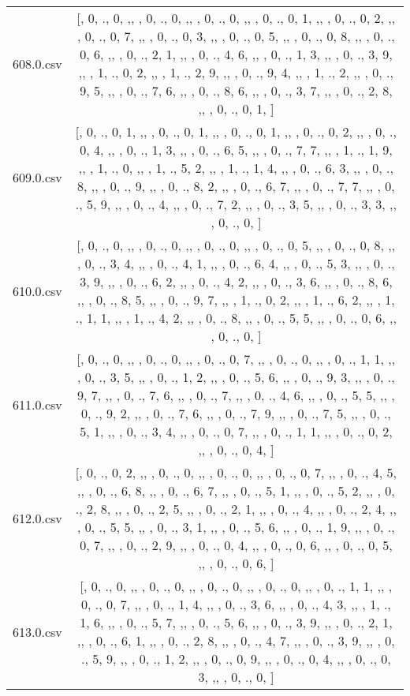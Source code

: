 \begin{table}[ht]
\begin{tabular}{@{}c c@{}}
	608.0.csv & [, 0, ., 0, ,,  , 0, ., 0, ,,  , 0, ., 0, ,,  , 0, ., 0, 1, ,,  , 0, ., 0, 2, ,,  , 0, ., 0, 7, ,,  , 0, ., 0, 3, ,,  , 0, ., 0, 5, ,,  , 0, ., 0, 8, ,,  , 0, ., 0, 6, ,,  , 0, ., 2, 1, ,,  , 0, ., 4, 6, ,,  , 0, ., 1, 3, ,,  , 0, ., 3, 9, ,,  , 1, ., 0, 2, ,,  , 1, ., 2, 9, ,,  , 0, ., 9, 4, ,,  , 1, ., 2, ,,  , 0, ., 9, 5, ,,  , 0, ., 7, 6, ,,  , 0, ., 8, 6, ,,  , 0, ., 3, 7, ,,  , 0, ., 2, 8, ,,  , 0, ., 0, 1, ]\\ 
	609.0.csv & [, 0, ., 0, 1, ,,  , 0, ., 0, 1, ,,  , 0, ., 0, 1, ,,  , 0, ., 0, 2, ,,  , 0, ., 0, 4, ,,  , 0, ., 1, 3, ,,  , 0, ., 6, 5, ,,  , 0, ., 7, 7, ,,  , 1, ., 1, 9, ,,  , 1, ., 0, ,,  , 1, ., 5, 2, ,,  , 1, ., 1, 4, ,,  , 0, ., 6, 3, ,,  , 0, ., 8, ,,  , 0, ., 9, ,,  , 0, ., 8, 2, ,,  , 0, ., 6, 7, ,,  , 0, ., 7, 7, ,,  , 0, ., 5, 9, ,,  , 0, ., 4, ,,  , 0, ., 7, 2, ,,  , 0, ., 3, 5, ,,  , 0, ., 3, 3, ,,  , 0, ., 0, ]\\ 
	610.0.csv & [, 0, ., 0, ,,  , 0, ., 0, ,,  , 0, ., 0, ,,  , 0, ., 0, 5, ,,  , 0, ., 0, 8, ,,  , 0, ., 3, 4, ,,  , 0, ., 4, 1, ,,  , 0, ., 6, 4, ,,  , 0, ., 5, 3, ,,  , 0, ., 3, 9, ,,  , 0, ., 6, 2, ,,  , 0, ., 4, 2, ,,  , 0, ., 3, 6, ,,  , 0, ., 8, 6, ,,  , 0, ., 8, 5, ,,  , 0, ., 9, 7, ,,  , 1, ., 0, 2, ,,  , 1, ., 6, 2, ,,  , 1, ., 1, 1, ,,  , 1, ., 4, 2, ,,  , 0, ., 8, ,,  , 0, ., 5, 5, ,,  , 0, ., 0, 6, ,,  , 0, ., 0, ]\\ 
	611.0.csv & [, 0, ., 0, ,,  , 0, ., 0, ,,  , 0, ., 0, 7, ,,  , 0, ., 0, ,,  , 0, ., 1, 1, ,,  , 0, ., 3, 5, ,,  , 0, ., 1, 2, ,,  , 0, ., 5, 6, ,,  , 0, ., 9, 3, ,,  , 0, ., 9, 7, ,,  , 0, ., 7, 6, ,,  , 0, ., 7, ,,  , 0, ., 4, 6, ,,  , 0, ., 5, 5, ,,  , 0, ., 9, 2, ,,  , 0, ., 7, 6, ,,  , 0, ., 7, 9, ,,  , 0, ., 7, 5, ,,  , 0, ., 5, 1, ,,  , 0, ., 3, 4, ,,  , 0, ., 0, 7, ,,  , 0, ., 1, 1, ,,  , 0, ., 0, 2, ,,  , 0, ., 0, 4, ]\\ 
	612.0.csv & [, 0, ., 0, 2, ,,  , 0, ., 0, ,,  , 0, ., 0, ,,  , 0, ., 0, 7, ,,  , 0, ., 4, 5, ,,  , 0, ., 6, 8, ,,  , 0, ., 6, 7, ,,  , 0, ., 5, 1, ,,  , 0, ., 5, 2, ,,  , 0, ., 2, 8, ,,  , 0, ., 2, 5, ,,  , 0, ., 2, 1, ,,  , 0, ., 4, ,,  , 0, ., 2, 4, ,,  , 0, ., 5, 5, ,,  , 0, ., 3, 1, ,,  , 0, ., 5, 6, ,,  , 0, ., 1, 9, ,,  , 0, ., 0, 7, ,,  , 0, ., 2, 9, ,,  , 0, ., 0, 4, ,,  , 0, ., 0, 6, ,,  , 0, ., 0, 5, ,,  , 0, ., 0, 6, ]\\ 
	613.0.csv & [, 0, ., 0, ,,  , 0, ., 0, ,,  , 0, ., 0, ,,  , 0, ., 0, ,,  , 0, ., 1, 1, ,,  , 0, ., 0, 7, ,,  , 0, ., 1, 4, ,,  , 0, ., 3, 6, ,,  , 0, ., 4, 3, ,,  , 1, ., 1, 6, ,,  , 0, ., 5, 7, ,,  , 0, ., 5, 6, ,,  , 0, ., 3, 9, ,,  , 0, ., 2, 1, ,,  , 0, ., 6, 1, ,,  , 0, ., 2, 8, ,,  , 0, ., 4, 7, ,,  , 0, ., 3, 9, ,,  , 0, ., 5, 9, ,,  , 0, ., 1, 2, ,,  , 0, ., 0, 9, ,,  , 0, ., 0, 4, ,,  , 0, ., 0, 3, ,,  , 0, ., 0, ]\\ 

\end{tabular}
\end{table}
